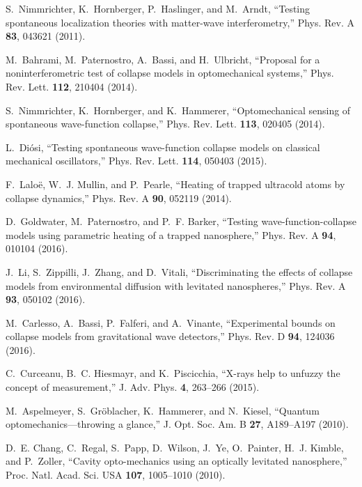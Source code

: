 \documentclass[%
 twocolumn,
 amsmath,amssymb,
 aps,
 pra,
]{revtex4-1}
\begin{document}
\begin{thebibliography}{10}
S.~Nimmrichter, K.~Hornberger, P.~Haslinger, and M.~Arndt, \enquote{{Testing
  spontaneous localization theories with matter-wave interferometry},} Phys.
  Rev. A \textbf{83}, 043621 (2011).

M.~Bahrami, M.~Paternostro, A.~Bassi, and H.~Ulbricht, \enquote{{Proposal for a
  noninterferometric test of collapse models in optomechanical systems},} Phys.
  Rev. Lett. \textbf{112}, 210404 (2014).

S.~Nimmrichter, K.~Hornberger, and K.~Hammerer, \enquote{{Optomechanical
  sensing of spontaneous wave-function collapse},} Phys. Rev. Lett.
  \textbf{113}, 020405 (2014).

L.~Di{\'o}si, \enquote{{Testing spontaneous wave-function collapse models on
  classical mechanical oscillators},} Phys. Rev. Lett. \textbf{114}, 050403
  (2015).

F.~Lalo{\"e}, W.~J. Mullin, and P.~Pearle, \enquote{{Heating of trapped
  ultracold atoms by collapse dynamics},} Phys. Rev. A \textbf{90}, 052119
  (2014).

D.~Goldwater, M.~Paternostro, and P.~F. Barker, \enquote{{Testing
  wave-function-collapse models using parametric heating of a trapped
  nanosphere},} Phys. Rev. A \textbf{94}, 010104 (2016).

J.~Li, S.~Zippilli, J.~Zhang, and D.~Vitali, \enquote{{Discriminating the
  effects of collapse models from environmental diffusion with levitated
  nanospheres},} Phys. Rev. A \textbf{93}, 050102 (2016).

M.~Carlesso, A.~Bassi, P.~Falferi, and A.~Vinante, \enquote{{Experimental
  bounds on collapse models from gravitational wave detectors},} Phys. Rev. D
  \textbf{94}, 124036 (2016).

C.~Curceanu, B.~C. Hiesmayr, and K.~Piscicchia, \enquote{{X-rays help to
  unfuzzy the concept of measurement},} J. Adv. Phys. \textbf{4}, 263--266
  (2015).

M.~Aspelmeyer, S.~Gr{\"o}blacher, K.~Hammerer, and N.~Kiesel, \enquote{{Quantum
  optomechanics---throwing a glance},} J. Opt. Soc. Am. B \textbf{27},
  A189--A197 (2010).

D.~E. Chang, C.~Regal, S.~Papp, D.~Wilson, J.~Ye, O.~Painter, H.~J. Kimble, and
  P.~Zoller, \enquote{Cavity opto-mechanics using an optically levitated
  nanosphere,} Proc. Natl. Acad. Sci. USA \textbf{107}, 1005--1010 (2010).


\end{thebibliography}
\end{document}
